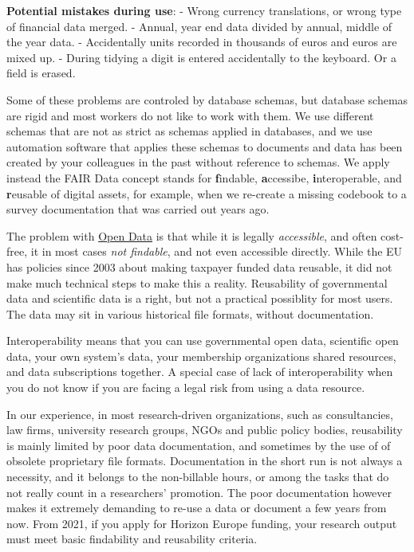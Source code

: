 \documentclass[
  a4paper,
  openany, a4paper, oneside]{book}
\begin{document}
\textbf{Potential mistakes during use}:
- Wrong currency translations, or wrong type of financial data merged.
- Annual, year end data divided by annual, middle of the year data.
- Accidentally units recorded in thousands of euros and euros are mixed up.
- During tidying a digit is entered accidentally to the keyboard. Or a field is erased.

Some of these problems are controled by database schemas, but database schemas are rigid and most workers do not like to work with them. We use different schemas that are not as strict as schemas applied in databases, and we use automation software that applies these schemas to documents and data has been created by your colleagues in the past without reference to schemas. We apply instead the FAIR Data concept stands for \textbf{f}indable, \textbf{a}ccessibe, \textbf{i}nteroperable, and \textbf{r}eusable of digital assets, for example, when we re-create a missing codebook to a survey documentation that was carried out years ago.

The problem with \protect\hyperlink{open-data}{Open Data} is that while it is legally \emph{accessible}, and often cost-free, it in most cases \emph{not findable}, and not even accessible directly. While the EU has policies since 2003 about making taxpayer funded data reusable, it did not make much technical steps to make this a reality. Reusability of governmental data and scientific data is a right, but not a practical possiblity for most users. The data may sit in various historical file formats, without documentation.

Interoperability means that you can use governmental open data, scientific open data, your own system's data, your membership organizations shared resources, and data subscriptions together. A special case of lack of interoperability when you do not know if you are facing a legal risk from using a data resource.

In our experience, in most research-driven organizations, such as consultancies, law firms, university research groups, NGOs and public policy bodies, reusability is mainly limited by poor data documentation, and sometimes by the use of of obsolete proprietary file formats. Documentation in the short run is not always a necessity, and it belongs to the non-billable hours, or among the tasks that do not really count in a researchers' promotion. The poor documentation however makes it extremely demanding to re-use a data or document a few years from now. From 2021, if you apply for Horizon Europe funding, your research output must meet basic findability and reusability criteria.
\end{document}

